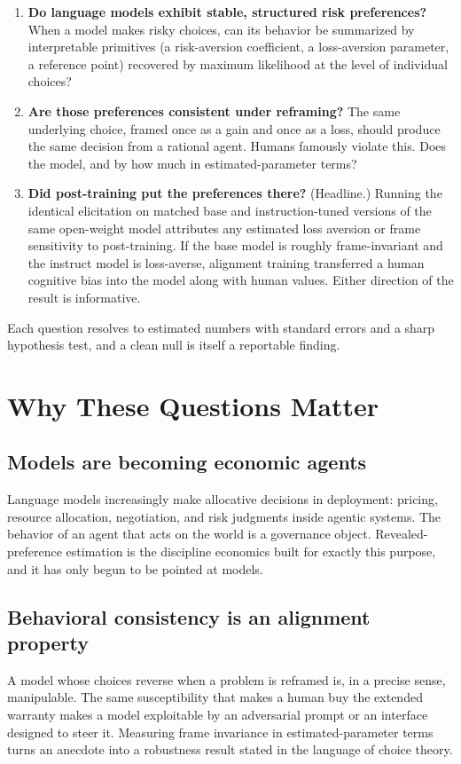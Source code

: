 \documentclass[11pt]{article}
\begin{document}
\begin{enumerate}[label=\textbf{Q\arabic*.}, leftmargin=*]
  \item \textbf{Do language models exhibit stable, structured risk preferences?} When a model makes
  risky choices, can its behavior be summarized by interpretable primitives (a risk-aversion
  coefficient, a loss-aversion parameter, a reference point) recovered by maximum likelihood at the
  level of individual choices?
  \item \textbf{Are those preferences consistent under reframing?} The same underlying choice, framed
  once as a gain and once as a loss, should produce the same decision from a rational agent. Humans
  famously violate this. Does the model, and by how much in estimated-parameter terms?
  \item \textbf{Did post-training put the preferences there?} (Headline.) Running the identical
  elicitation on matched base and instruction-tuned versions of the same open-weight model attributes
  any estimated loss aversion or frame sensitivity to post-training. If the base model is roughly
  frame-invariant and the instruct model is loss-averse, alignment training transferred a human
  cognitive bias into the model along with human values. Either direction of the result is informative.
\end{enumerate}

Each question resolves to estimated numbers with standard errors and a sharp hypothesis test, and a
clean null is itself a reportable finding.

\section{Why These Questions Matter}

\subsection{Models are becoming economic agents}
Language models increasingly make allocative decisions in deployment: pricing, resource allocation,
negotiation, and risk judgments inside agentic systems. The behavior of an agent that acts on the
world is a governance object. Revealed-preference estimation is the discipline economics built for
exactly this purpose, and it has only begun to be pointed at models.

\subsection{Behavioral consistency is an alignment property}
A model whose choices reverse when a problem is reframed is, in a precise sense, manipulable. The
same susceptibility that makes a human buy the extended warranty makes a model exploitable by an
adversarial prompt or an interface designed to steer it. Measuring frame invariance in estimated-parameter
terms turns an anecdote into a robustness result stated in the language of choice theory.
\end{document}
